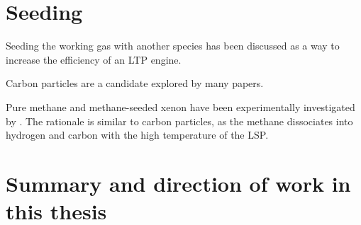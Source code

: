 

    \section{Seeding}

        Seeding the working gas with another species has been discussed as a way to increase the efficiency of an LTP engine.

        Carbon particles are a candidate explored by many papers. %

        Pure methane and methane-seeded xenon have been experimentally investigated by \textcite{kameiMethaneMethaneXenon2020}. %
        The rationale is similar to carbon particles, as the methane dissociates into hydrogen and carbon with the high temperature of the LSP.

    \section{Summary and direction of work in this thesis}

